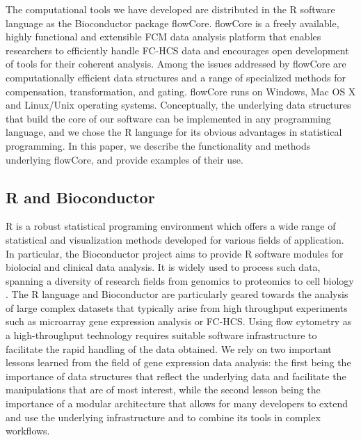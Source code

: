 \documentclass[12pt]{article}
\begin{document}
The computational tools we have developed are distributed in the R
software language \citep{Rmain} as the Bioconductor
\citep{BIOC} package flowCore. flowCore is a freely available,
highly functional and extensible FCM data analysis platform that
enables researchers to efficiently handle FC-HCS data and encourages
open development of tools for their coherent analysis. Among the
issues addressed by flowCore are computationally efficient data
structures and a range of specialized methods for compensation,
transformation, and gating.  flowCore runs on Windows, Mac OS X and
Linux/Unix operating systems. Conceptually, the underlying data
structures that build the core of our software can be implemented in
any programming language, and we chose the R language for its obvious
advantages in statistical programming. In this paper, we describe the
functionality and methods underlying flowCore, and provide examples of
their use.


\subsection*{R and Bioconductor}
R is a robust statistical programing environment which offers a wide
range of statistical and visualization methods developed for various
fields of application. In particular, the Bioconductor project aims to
provide R software modules for biolocial and clinical data analysis.
It is widely used to process such data, spanning a diversity of
research fields from genomics to proteomics to cell biology
\citep{gentleman2006bos}. The R language and Bioconductor are
particularly geared towards the analysis of large complex datasets
that typically arise from high throughput experiments such as
microarray gene expression analysis or FC-HCS. Using flow cytometry as
a high-throughput technology requires suitable software infrastructure
to facilitate the rapid handling of the data obtained. We rely on two
important lessons learned from the field of gene expression data
analysis: the first being the importance of data structures that
reflect the underlying data and facilitate the manipulations that are
of most interest, while the second lesson being the importance of a
modular architecture that allows for many developers to extend and use
the underlying infrastructure and to combine its tools in complex
workflows.
\end{document}

